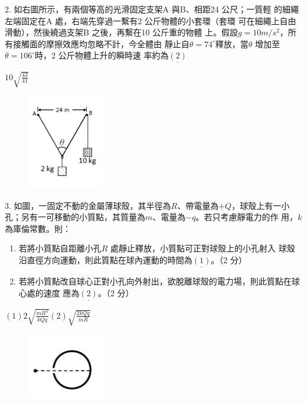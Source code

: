 \documentclass[cn,10pt,math=newtx]{elegantbook}
\begin{document}
\begin{example}
   2. 如右圖所示，有兩個等高的光滑固定支架A 與B、相距24 公尺；一質輕
的細繩左端固定在A 處，右端先穿過一繫有2 公斤物體的小套環（套環
可在細繩上自由滑動），然後繞過支架B 之後，再繫在10 公斤重的物體
上。假設$g = 10 m/s^2$，所有接觸面的摩擦效應均忽略不計，今全體由
靜止自$\theta = 74^\circ$釋放，當$\theta$ 增加至$\theta = 106^\circ$時，2 公斤物體上升的瞬時速
率約為$\underline{(2)}$
    \rightline{[全國聯招教甄109]}
\end{example}
\begin{solution}
    $10\sqrt{\frac{43}{41}}$
\end{solution}
\begin{figure}[htbp]
    \flushright
    \includegraphics[width=0.3\textwidth]{image/109全國22.png}
  \end{figure}
\newpage

\begin{example}
   3. 如圖，一固定不動的金屬薄球殼，其半徑為$R$、帶電量為$+Q$，球殼上有一小
孔；另有一可移動的小質點，其質量為$m$、電量為$-q$。若只考慮靜電力的作
用，$k$ 為庫倫常數。則：
\begin{enumerate}[label=(\arabic*)] 
  \item 若將小質點自距離小孔$R$ 處靜止釋放，小質點可正對球殼上的小孔射入
球殼沿直徑方向運動，則此質點在球內運動的時間為$\underline{(1)}$。（2 分）
  \item 若將小質點改自球心正對小孔向外射出，欲脫離球殼的電力場，則此質點在球心處的速度
應為$\underline{(2)}$。（2 分）
    \end{enumerate}
    \rightline{[全國聯招教甄109]}
\end{example}
\begin{solution}
    $(1) 2\sqrt{\frac{mR^3}{kQq}}  (2) \sqrt{\frac{2kQq}{mR}}$
\end{solution}
\begin{figure}[htbp]
    \flushright
    \includegraphics[width=0.3\textwidth]{image/109全國23.png}
  \end{figure}
\newpage
\end{document}
